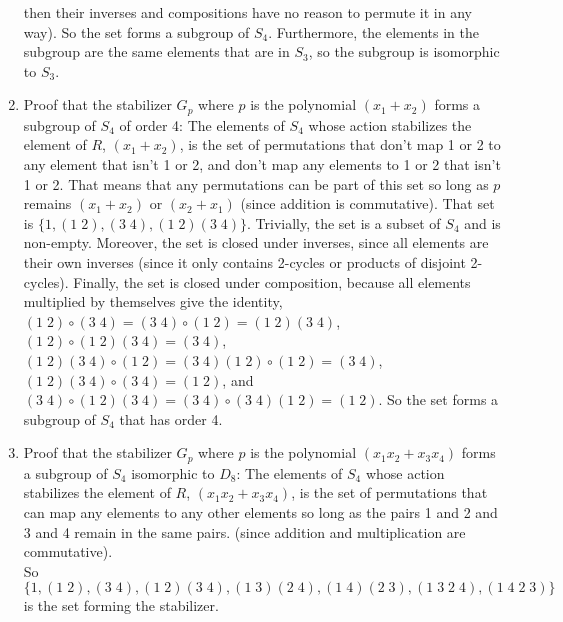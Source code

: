 \documentclass[12pt]{article}
\begin{document}
\begin{enumerate}[label=\textbf{\alph*.}]
            then their inverses and compositions have no reason to
            permute it in any way).
            So the set forms a subgroup of $S_4$.
            Furthermore, the elements in the subgroup
            are the same elements that are in $S_3$,
            so the subgroup is isomorphic to $S_3$.
        \item
            Proof that the stabilizer $G_p$
            where $p$ is the polynomial $(x_1 + x_2)$
            forms a subgroup of $S_4$ of order 4:
            The elements of $S_4$ whose action stabilizes the element 
            of $R$, $(x_1 + x_2)$,
            is the set of permutations that don't map 1 or 2
            to any element that isn't 1 or 2, and don't map
            any elements to 1 or 2 that isn't 1 or 2.
            That means that any permutations can be part of this set
            so long as $p$ remains $(x_1 + x_2)$ or $(x_2 + x_1)$
            (since addition is commutative).
            That set is $\{1, (1\;2), (3\;4), (1\;2)(3\;4)\}$.
            Trivially, the set is a subset of $S_4$ and is non-empty.
            Moreover, the set is closed under inverses,
            since all elements are their own inverses (since it
            only contains 2-cycles or products of disjoint 2-cycles).
            Finally, the set is closed under composition,
            because all elements multiplied by themselves give
            the identity,
            $(1\;2) \circ (3\;4) = (3\;4) \circ (1\;2) = (1\;2)(3\;4)$,
            $(1\;2) \circ (1\;2)(3\;4) = (3\;4)$,
            $(1\;2)(3\;4) \circ (1\;2) = (3\;4)(1\;2) \circ (1\;2) = (3\;4)$,
            $(1\;2)(3\;4) \circ (3\;4) = (1\;2)$,
            and
            $(3\;4) \circ (1\;2)(3\;4) = (3\;4) \circ (3\;4)(1\;2) = (1\;2)$.
            So the set forms a subgroup of $S_4$ that has order 4.
        \item
            Proof that the stabilizer $G_p$
            where $p$ is the polynomial $(x_1x_2 + x_3x_4)$
            forms a subgroup of $S_4$ isomorphic to $D_8$:
            The elements of $S_4$ whose action stabilizes the element 
            of $R$, $(x_1x_2 + x_3x_4)$,
            is the set of permutations that can map any elements
            to any other elements so long
            as the pairs 1 and 2 and 3 and 4 remain in the same pairs.
            (since addition and multiplication are commutative). \\
            So $\{1, (1\;2), (3\;4), (1\;2)(3\;4),
            (1\;3)(2\;4), (1\;4)(2\;3), (1\;3\;2\;4), (1\;4\;2\;3)\}$
            is the set forming the stabilizer.

\end{enumerate}
\end{document}
